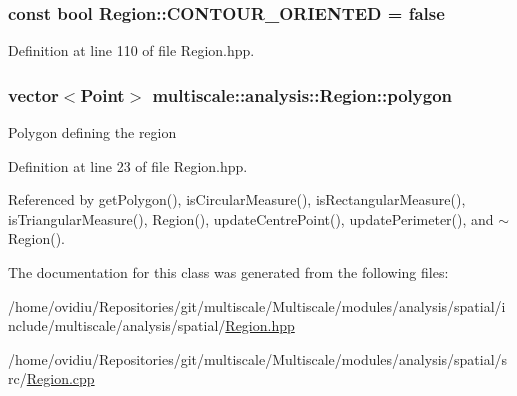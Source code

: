 \hypertarget{classmultiscale_1_1analysis_1_1Region_a875a0f14dacf6904cabfa1f31020e6e2}{
\subsubsection[{\-C\-O\-N\-T\-O\-U\-R\-\_\-\-O\-R\-I\-E\-N\-T\-E\-D}]{\setlength{\rightskip}{0pt plus 5cm}const bool {\bf \-Region\-::\-C\-O\-N\-T\-O\-U\-R\-\_\-\-O\-R\-I\-E\-N\-T\-E\-D} = false}}\label{classmultiscale_1_1analysis_1_1Region_a875a0f14dacf6904cabfa1f31020e6e2}


\-Definition at line 110 of file \-Region.\-hpp.

\hypertarget{classmultiscale_1_1analysis_1_1Region_a40d1b47f30bb09c6a47521a968163b6d}{
\subsubsection[{polygon}]{\setlength{\rightskip}{0pt plus 5cm}vector$<$\-Point$>$ {\bf multiscale\-::analysis\-::\-Region\-::polygon}}}\label{classmultiscale_1_1analysis_1_1Region_a40d1b47f30bb09c6a47521a968163b6d}
\-Polygon defining the region 

\-Definition at line 23 of file \-Region.\-hpp.



\-Referenced by get\-Polygon(), is\-Circular\-Measure(), is\-Rectangular\-Measure(), is\-Triangular\-Measure(), \-Region(), update\-Centre\-Point(), update\-Perimeter(), and $\sim$\-Region().



\-The documentation for this class was generated from the following files\-:\begin{DoxyCompactItemize}
\item 
/home/ovidiu/\-Repositories/git/multiscale/\-Multiscale/modules/analysis/spatial/include/multiscale/analysis/spatial/\hyperlink{analysis_2spatial_2include_2multiscale_2analysis_2spatial_2Region_8hpp}{\-Region.\-hpp}\item 
/home/ovidiu/\-Repositories/git/multiscale/\-Multiscale/modules/analysis/spatial/src/\hyperlink{Region_8cpp}{\-Region.\-cpp}\end{DoxyCompactItemize}

